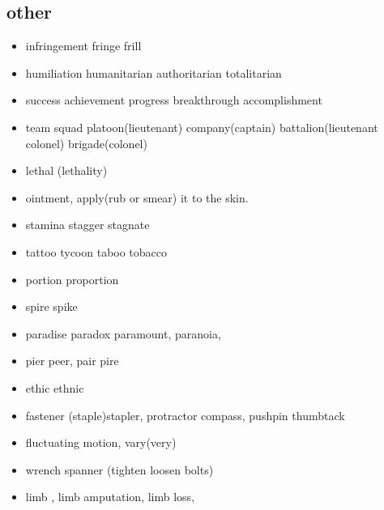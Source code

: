\documentclass[a4paper,11pt,twoside]{book}
\begin{document}
\subsection{other}
\begin{itemize}
	\item infringement fringe frill
	
	\item humiliation humanitarian authoritarian totalitarian 
	
	\item success achievement progress breakthrough accomplishment
	
	\item team squad platoon(lieutenant) company(captain) battalion(lieutenant colonel) brigade(colonel)
	
	\item lethal (lethality) 
	
	\item ointment, apply(rub or smear) it to the skin. 
	
	\item stamina stagger stagnate
	
	\item tattoo tycoon taboo tobacco 
	
	\item portion proportion
	
	\item spire spike
	
	
	
	\item paradise paradox paramount, paranoia, 
	
	\item pier peer,  pair pire
	
	\item ethic ethnic
	
	\item fastener (staple)stapler, protractor compass, pushpin thumbtack 
	
	\item fluctuating motion, vary(very)
	
	\item wrench spanner (tighten loosen bolts)
	
	\item limb , limb amputation, limb loss, 
	
\end{itemize}
	
\end{document}
